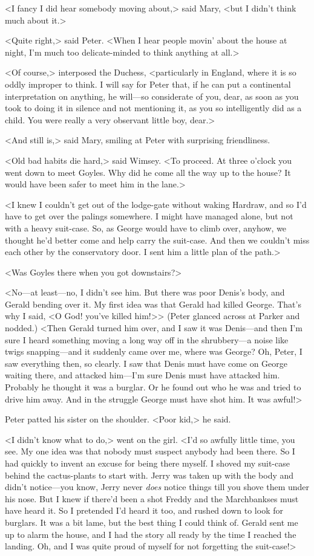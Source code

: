 <I fancy I did hear somebody moving about,> said Mary, <but I didn't think much about it.>

<Quite right,> said Peter. <When I hear people movin' about the house at night, I'm much too delicate-minded to think anything at all.>

<Of course,> interposed the Duchess, <particularly in England, where it is so oddly improper to think. I will say for Peter that, if he can put a continental interpretation on anything, he will—so considerate of you, dear, as soon as you took to doing it in silence and not mentioning it, as you so intelligently did as a child. You were really a very observant little boy, dear.>

<And still is,> said Mary, smiling at Peter with surprising friendliness.

<Old bad habits die hard,> said Wimsey. <To proceed. At three o'clock you went down to meet Goyles. Why did he come all the way up to the house? It would have been safer to meet him in the lane.>

<I knew I couldn't get out of the lodge-gate without waking Hardraw, and so I'd have to get over the palings somewhere. I might have managed alone, but not with a heavy suit-case. So, as George would have to climb over, anyhow, we thought he'd better come and help carry the suit-case. And then we couldn't miss each other by the conservatory door. I sent him a little plan of the path.>

<Was Goyles there when you got downstairs?>

<No—at least—no, I didn't see him. But there was poor Denis's body, and Gerald bending over it. My first idea was that Gerald had killed George. That's why I said, <O God! you've killed him!>> (Peter glanced across at Parker and nodded.) <Then Gerald turned him over, and I saw it was Denis—and then I'm sure I heard something moving a long way off in the shrubbery—a noise like twigs snapping—and it suddenly came over me, where was George? Oh, Peter, I saw everything then, so clearly. I saw that Denis must have come on George waiting there, and attacked him—I'm sure Denis must have attacked him. Probably he thought it was a burglar. Or he found out who he was and tried to drive him away. And in the struggle George must have shot him. It was awful!>

Peter patted his sister on the shoulder. <Poor kid,> he said.

<I didn't know what to do,> went on the girl. <I'd so awfully little time, you see. My one idea was that nobody must suspect anybody had been there. So I had quickly to invent an excuse for being there myself. I shoved my suit-case behind the cactus-plants to start with.  Jerry was taken up with the body and didn't notice—you know, Jerry never \emph{does} notice things till you shove them under his nose. But I knew if there'd been a shot Freddy and the Marchbankses must have heard it. So I pretended I'd heard it too, and rushed down to look for burglars. It was a bit lame, but the best thing I could think of.  Gerald sent me up to alarm the house, and I had the story all ready by the time I reached the landing. Oh, and I was quite proud of myself for not forgetting the suit-case!>

